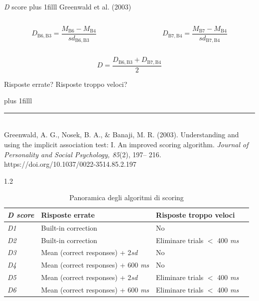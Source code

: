 \documentclass[compress]{beamer}
\newcommand\Factor{1.2}
\begin{document}
\begin{frame}{\emph{D} score}
	\vskip0pt plus 1filll
Greenwald et al. (2003)
	
	\vspace{5mm}
	\begin{columns}
		\begin{column}{.50\linewidth}
			$$D_{\mathrm{B6,B3}} = \frac{M_{\mathrm{B6}} - M_{\mathrm{B4}}}{sd_{\mathrm{B6, B3}}}$$
		\end{column}
		\begin{column}{.50\linewidth}
			$$D_{\mathrm{B7,B4}} = \frac{M_{\mathrm{B7}} - M_{\mathrm{B4}}}{sd_{\mathrm{B7, B4}}}$$
	\end{column}
	\end{columns}
	
	\vspace{5mm}
		\begin{equation*}
		D = \frac{D_{\mathrm{B6,B3}} + D_{\mathrm{B7,B4}}}{2}
	\end{equation*}
	
	\pause
	\vspace{5mm}
	Risposte errate? Risposte troppo veloci?
	
	\vskip0pt plus 1filll
	
	\color{template}\rule{0.30\linewidth}{0.5pt}\\
	\color{black}
	\scriptsize{Greenwald, A. G., Nosek, B. A., \& Banaji, M. R.
		(2003). Understanding and using the implicit association test: I. An improved scoring algorithm. \emph{Journal
		of Personality and Social Psychology, 85}(2), 197–
		216. https://doi.org/10.1037/0022-3514.85.2.197}
\end{frame}

\begin{frame}
	
	\begin{spacing}\Factor
		\begin{table}[th!]
			\centering
			\caption{\label{tab:overview} Panoramica degli algoritmi di scoring}
			\begin{tabularx}{\linewidth}{llll}
				\hline
				\emph{D score} & Risposte errate & Risposte troppo veloci\\\hline
				\emph{D1} & Built-in correction & No \\
				\emph{D2} & Built-in correction & Eliminare trials $<$ 400 \emph{ms} \\
				\emph{D3} & Mean (correct responses) + 2\emph{sd} & No\\
				\emph{D4} & Mean (correct responses) + 600 \emph{ms} & No \\
				\emph{D5} & Mean (correct responses) + 2\emph{sd} & Eliminare trials $<$ 400 \emph{ms}\\
				\emph{D6} & Mean (correct responses) + 600 \emph{ms} & Eliminare trials $<$ 400 \emph{ms} \\\hline
			\end{tabularx}
		\end{table}
	\end{spacing}
\end{frame}
\end{document}
